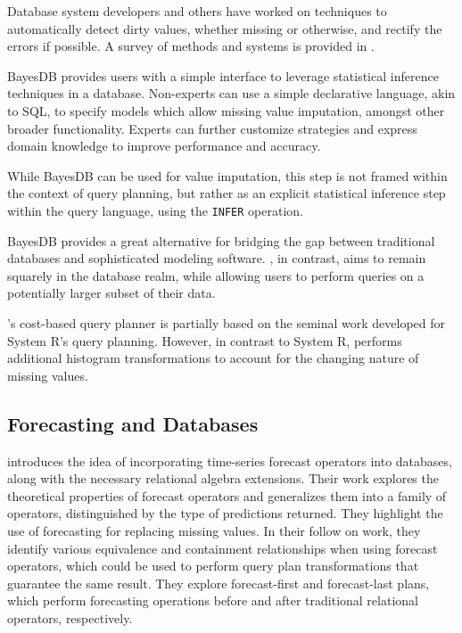 Database system developers and others have worked on techniques to automatically
detect dirty values, whether missing or otherwise, and rectify the errors if
possible. A survey of methods and systems is provided in
\cite{hellerstein2008quantitative}.

BayesDB \cite{mansinghka2015bayesdb} provides users with a simple interface to 
leverage statistical inference techniques in a database. Non-experts
can use a simple declarative language, akin to SQL, to specify models
which allow missing value imputation, amongst other broader functionality.
Experts can further customize strategies and express domain knowledge to
improve performance and accuracy.

While BayesDB can be used for value imputation, this step is not framed
within the context of query planning, but rather as an explicit statistical
inference step within the query language, using the \verb|INFER| operation. 

BayesDB provides a great alternative for bridging the gap between
traditional databases and sophisticated modeling software. \ProjectName{}, in
contrast, aims to remain squarely in the database realm, while allowing
users to perform queries on a potentially larger subset of their data.

\ProjectName's cost-based query planner 
is partially based on the seminal work developed for System R's query planning\cite{blasgen1981system}.
However, in contrast to System R, \ProjectName{} performs additional histogram transformations to account
for the changing nature of missing values.

\subsection{Forecasting and Databases}
\cite{parisi2011embedding} introduces the idea of incorporating time-series forecast operators into
databases, along with the necessary relational algebra extensions. Their work explores the theoretical
properties of forecast operators and generalizes them into a family of operators, distinguished by
the type of predictions returned. They highlight the use of forecasting for replacing missing values.
In their follow on work\cite{parisi2013temporal}, they identify various equivalence and containment
relationships when using forecast operators, which could be used to perform query plan transformations that guarantee the same result. They
explore forecast-first and forecast-last plans, which perform forecasting operations before and after traditional
relational operators, respectively.

